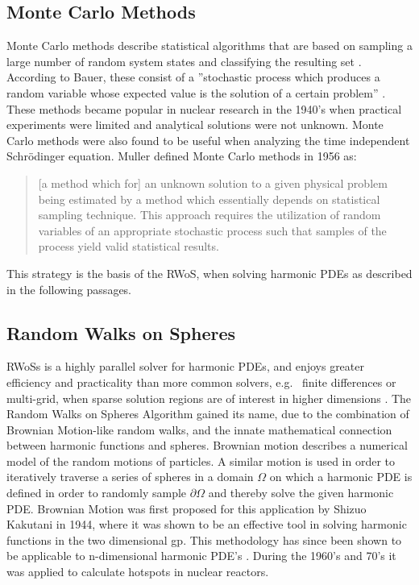 \subsection{Monte Carlo Methods}\label{ssec:montecarlo}
Monte Carlo methods describe statistical algorithms that are based on sampling a
large number of random system states and classifying the resulting set \cite{Metropolis}.
According to Bauer, these consist of a ''stochastic process which produces a random variable
 whose expected value is the solution of a certain problem'' \cite{bauer}.
These methods became popular in nuclear research in the 1940's when practical
experiments were limited and analytical solutions were not unknown.  Monte Carlo
methods were also found to be useful when analyzing the time independent Schr\"odinger
equation\cite{Metropolis}. Muller defined Monte Carlo methods in 1956 as:
\begin{quote}[a method which for] an unknown solution to a given physical
problem being estimated by a method which essentially depends on statistical sampling technique.
This approach requires the utilization of random variables of an appropriate
stochastic process such that samples of the process yield valid statistical
results\cite{Muller}.\end{quote}
This strategy is the basis of the \Gls{RWoS}, when solving harmonic
\Glspl{PDE} as described in the following passages.
\subsection{Random Walks on Spheres}\label{ssec:RWoS}
 \Glspl{RWoS} is a highly parallel solver for harmonic \Glspl{PDE},
and enjoys greater efficiency and practicality than more common solvers, e.g.~
finite differences or multi-grid, when sparse solution regions are of
interest in higher dimensions \cite{DeLaurentis,Bornemann,Yang}.
The Random Walks on Spheres Algorithm
gained its name, due to the combination of Brownian Motion-like random walks,
and the innate mathematical connection between
harmonic functions and spheres\cite{Axler1992}.
Brownian motion describes a numerical model
of the random motions of particles.  A similar motion is used in order to iteratively
traverse a series %
of spheres in a domain $\Omega$ on which a harmonic PDE is defined in order to
randomly sample $\partial \Omega$ and thereby %
solve the given harmonic PDE\cite{DeLaurentis}.
Brownian Motion
was first
proposed for this application by Shizuo Kakutani in 1944\cite{kakutani1944},
where it was shown to be an effective tool
in solving harmonic functions in the two dimensional \Gls{gp}. This methodology has since been
shown to be applicable to n-dimensional harmonic PDE's \cite{DeLaurentis}.  During the 1960's
and 70's it was applied to calculate hotspots in nuclear reactors\cite{Bornemann}.

